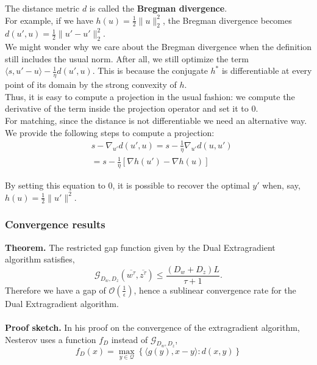 \documentclass{article}
\begin{document}
The distance metric $d$ is called the \textbf{Bregman divergence}.\\ For example, if we have $h( u) = \frac{1}{2} \lVert  u \rVert_2^2 $, the Bregman divergence becomes $d( u',  u) = \frac{1}{2} \lVert  u' -  u' \rVert_2^2$.\\
We might wonder why we care about the Bregman divergence when the definition still includes the usual norm. After all, we still optimize the term $\langle  s,  u' -  u \rangle - \frac{1}{\eta} d( u',   u)$. This is because the conjugate $h^{*}$ is differentiable at every point of its domain by the strong convexity of $h$.\\
Thus, it is easy to compute a projection in the usual fashion: we compute the derivative of the term inside the projection operator and set it to 0.\\
For matching, since the distance is not differentiable we need an alternative way. We provide the following steps to compute a projection: 
\begin{equation}
\begin{aligned}
  & s - \nabla_{ u'} d( u',  u) =  s - \frac{1}{\eta} \nabla_{ u'} d( u,  u')\\
  &=  s - \frac{1}{\eta} \left [\nabla h( u') - \nabla h( u) \right]
\end{aligned}
\end{equation}

By setting this equation to 0, it is possible to recover the optimal $ y'$ when, say, \quad $h( u) = \frac{1}{2} \lVert  u' \rVert^2$. 

\subsubsection{Convergence results} 
\textbf{Theorem.} The restricted gap function given by the Dual Extragradient algorithm satisfies, 
\begin{equation} \mathcal{G}_{D_{ w}, D_{ z}}(\overline{ w^{\tau}},
\overline{ z^{\tau}}) \leq \frac{\left( D_{ w} + D_{ z} \right)
L}{\tau + 1}.
\label{eq:ub}
\end{equation}
Therefore we have a gap of $\mathcal{O}(\frac{1}{\epsilon})$, hence a sublinear convergence rate for the Dual Extragradient algorithm.\\
\\
\textbf{Proof sketch.} In his proof on the convergence of the extragradient algorithm, Nesterov uses a
function $f_D$ instead of $\mathcal{G}_{D_{ w}, D_{ z}}$, 
\begin{equation}
f_D( x) = \max_{ y \in \mathcal{Q}} \left \{ \langle g( y),  x -
 y \rangle : d( x,  y) \right \}
\end{equation}
\end{document}
